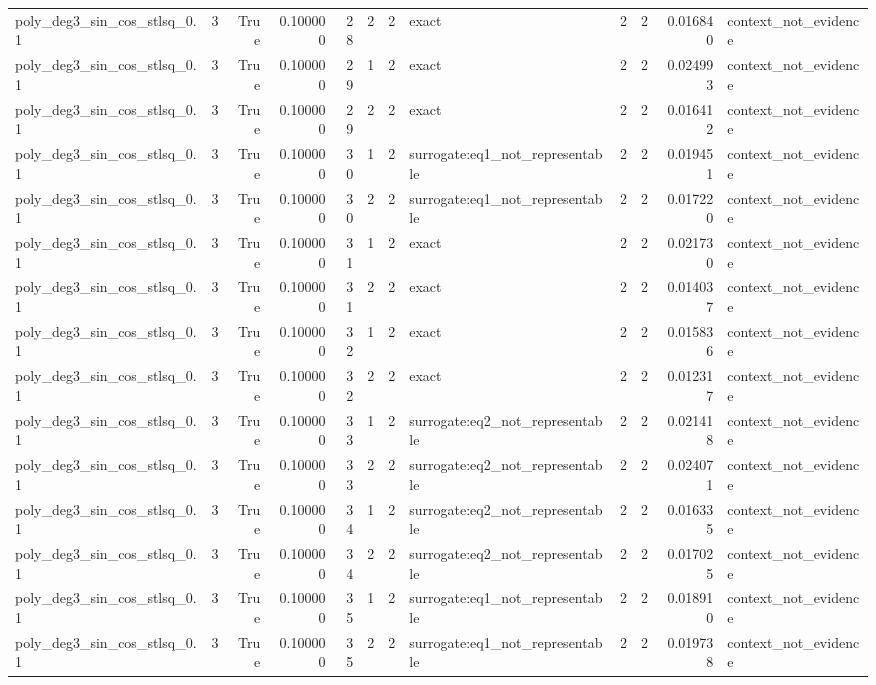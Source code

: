 \begin{tabular}{lrrrrrrlrrrl}
poly\_deg3\_sin\_cos\_stlsq\_0.1 & 3 & True & 0.100000 & 28 & 2 & 2 & exact & 2 & 2 & 0.016840 & context\_not\_evidence \\
poly\_deg3\_sin\_cos\_stlsq\_0.1 & 3 & True & 0.100000 & 29 & 1 & 2 & exact & 2 & 2 & 0.024993 & context\_not\_evidence \\
poly\_deg3\_sin\_cos\_stlsq\_0.1 & 3 & True & 0.100000 & 29 & 2 & 2 & exact & 2 & 2 & 0.016412 & context\_not\_evidence \\
poly\_deg3\_sin\_cos\_stlsq\_0.1 & 3 & True & 0.100000 & 30 & 1 & 2 & surrogate:eq1\_not\_representable & 2 & 2 & 0.019451 & context\_not\_evidence \\
poly\_deg3\_sin\_cos\_stlsq\_0.1 & 3 & True & 0.100000 & 30 & 2 & 2 & surrogate:eq1\_not\_representable & 2 & 2 & 0.017220 & context\_not\_evidence \\
poly\_deg3\_sin\_cos\_stlsq\_0.1 & 3 & True & 0.100000 & 31 & 1 & 2 & exact & 2 & 2 & 0.021730 & context\_not\_evidence \\
poly\_deg3\_sin\_cos\_stlsq\_0.1 & 3 & True & 0.100000 & 31 & 2 & 2 & exact & 2 & 2 & 0.014037 & context\_not\_evidence \\
poly\_deg3\_sin\_cos\_stlsq\_0.1 & 3 & True & 0.100000 & 32 & 1 & 2 & exact & 2 & 2 & 0.015836 & context\_not\_evidence \\
poly\_deg3\_sin\_cos\_stlsq\_0.1 & 3 & True & 0.100000 & 32 & 2 & 2 & exact & 2 & 2 & 0.012317 & context\_not\_evidence \\
poly\_deg3\_sin\_cos\_stlsq\_0.1 & 3 & True & 0.100000 & 33 & 1 & 2 & surrogate:eq2\_not\_representable & 2 & 2 & 0.021418 & context\_not\_evidence \\
poly\_deg3\_sin\_cos\_stlsq\_0.1 & 3 & True & 0.100000 & 33 & 2 & 2 & surrogate:eq2\_not\_representable & 2 & 2 & 0.024071 & context\_not\_evidence \\
poly\_deg3\_sin\_cos\_stlsq\_0.1 & 3 & True & 0.100000 & 34 & 1 & 2 & surrogate:eq2\_not\_representable & 2 & 2 & 0.016335 & context\_not\_evidence \\
poly\_deg3\_sin\_cos\_stlsq\_0.1 & 3 & True & 0.100000 & 34 & 2 & 2 & surrogate:eq2\_not\_representable & 2 & 2 & 0.017025 & context\_not\_evidence \\
poly\_deg3\_sin\_cos\_stlsq\_0.1 & 3 & True & 0.100000 & 35 & 1 & 2 & surrogate:eq1\_not\_representable & 2 & 2 & 0.018910 & context\_not\_evidence \\
poly\_deg3\_sin\_cos\_stlsq\_0.1 & 3 & True & 0.100000 & 35 & 2 & 2 & surrogate:eq1\_not\_representable & 2 & 2 & 0.019738 & context\_not\_evidence \\

\end{tabular}
